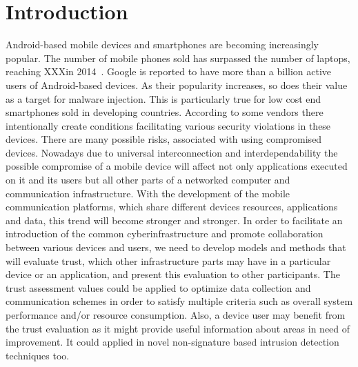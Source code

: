 \section{Introduction}

Android-based mobile devices and smartphones are becoming increasingly popular.  The number of mobile phones
sold has surpassed the number of laptops, reaching XXXin 2014~\cite{}.  Google is reported\cite{} to have more than
a billion active users of Android-based devices.  As their popularity increases, so does their value as
a target for malware injection.  
This is particularly true for low cost end smartphones sold in developing countries. According to \cite{}
some vendors there intentionally create conditions facilitating various security violations in these devices.
 There are many possible risks, associated with using compromised devices.  Nowadays due to universal interconnection and 
interdependability the 
possible compromise of a mobile device will affect not only applications executed on it and its users but all other parts 
of a networked computer and communication infrastructure.
With the development of the mobile communication platforms, which share different devices resources, applications and data, 
this trend will become stronger and stronger. 
In order to facilitate an introduction of the common cyberinfrastructure and promote collaboration between various devices 
and users, we need to develop models and methods that will evaluate trust, which other infrastructure parts may have in a 
particular device or an application, and present this evaluation to other participants. The trust assessment values could 
be applied to optimize data collection and communication schemes in order to satisfy multiple criteria such as overall 
system performance and/or resource consumption. Also, a device user may benefit from the trust evaluation as it might 
provide useful information about areas in need of improvement. It could applied in novel non-signature based intrusion 
detection techniques too.

